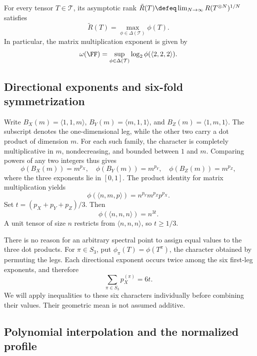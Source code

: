 \begin{theorem}
\label{thm:mm-nine-fourths-strassen-duality}
For every tensor \(T \in \mathcal{T}\), its asymptotic rank \(\tilde{R}(T) \defeq \lim_{N\to\infty} R(T^{\otimes N})^{1/N}\) satisfies
\[
  \tilde{R}(T) = \max_{\phi \in \Delta(\mathcal{T})} \phi(T).
\]
In particular, the matrix multiplication exponent is given by
\[
  \omega(\FF) = \sup_{\phi \in \Delta(\mathcal{T})} \log_2 \phi(\langle 2, 2, 2 \rangle).
\]
\end{theorem}

\subsection{Directional exponents and six-fold symmetrization}

Write \(B_X(m)=\langle1,1,m\rangle\), \(B_Y(m)=\langle m,1,1\rangle\), and \(B_Z(m)=\langle1,m,1\rangle\). The subscript denotes the one-dimensional leg, while the other two carry a dot product of dimension \(m\). For each such family, the character is completely multiplicative in \(m\), nondecreasing, and bounded between \(1\) and \(m\). Comparing powers of any two integers thus gives
\[
 \phi(B_X(m))=m^{p_X},\quad
 \phi(B_Y(m))=m^{p_Y},\quad
 \phi(B_Z(m))=m^{p_Z},
\]
where the three exponents lie in \([0,1]\). The product identity for matrix multiplication yields
\[
 \phi(\langle n,m,p\rangle)=n^{p_Y}m^{p_Z}p^{p_X}.
\]
Set \(t=(p_X+p_Y+p_Z)/3\). Then
\begin{equation}
 \phi(\langle n,n,n\rangle)=n^{3t}.
 \label{eq:mm-nine-fourths-theta}
\end{equation}
A unit tensor of size \(n\) restricts from \(\langle n,n,n\rangle\), so \(t\geq1/3\).

There is no reason for an arbitrary spectral point to assign equal values to the three dot products. For \(\pi\in S_3\), put \(\phi_\pi(T)=\phi(T^\pi)\), the character obtained by permuting the legs. Each directional exponent occurs twice among the six first-leg exponents, and therefore
\[
 \sum_{\pi\in S_3}p_X^{(\pi)}=6t.
\]
We will apply inequalities to these six characters individually before combining their values. Their geometric mean is not assumed additive.

\subsection{Polynomial interpolation and the normalized profile}

